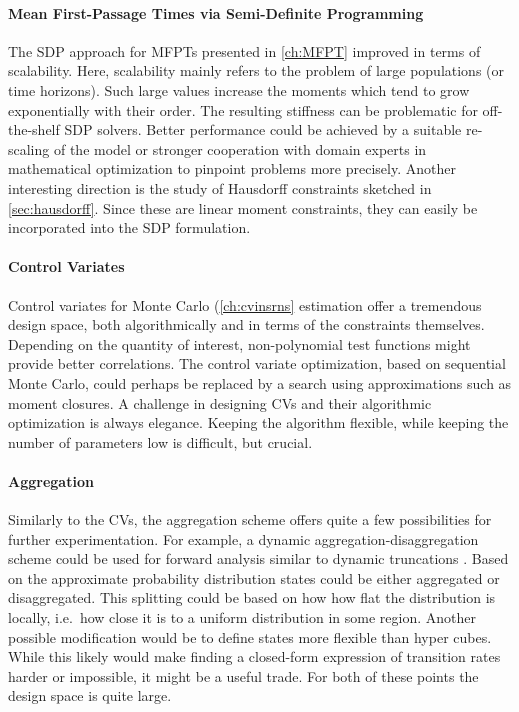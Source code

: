 \paragraph{Mean First-Passage Times via Semi-Definite Programming}
The \ac{SDP} approach for \acp{MFPT} presented in \autoref{ch:MFPT}
improved in terms of scalability.
Here, scalability mainly refers to the problem of large populations
(or time horizons).
Such large values increase the moments which tend to grow
exponentially with their order.
The resulting stiffness can be problematic for off-the-shelf \ac{SDP} solvers.
Better performance could be achieved by a suitable re-scaling of the
model or stronger cooperation with domain experts in mathematical
optimization to pinpoint problems more precisely.
Another interesting direction is the study of Hausdorff constraints
sketched in \autoref{sec:hausdorff}.
Since these are linear moment constraints, they can easily be
incorporated into the \ac{SDP} formulation.

\paragraph{Control Variates}
Control variates for Monte Carlo (\autoref{ch:cvinsrns} estimation
  offer a tremendous design space, both algorithmically and in terms
  of the constraints themselves.
  Depending on the quantity of interest, non-polynomial test
  functions might provide better correlations.
  The control variate optimization, based on sequential Monte Carlo,
  could perhaps be replaced by a search using approximations such as
  moment closures.
  A challenge in designing \acp{CV} and their algorithmic
  optimization is always elegance.
  Keeping the algorithm flexible, while keeping the number of
  parameters low is difficult, but crucial.

  \paragraph{Aggregation}
  Similarly to the \aclp{CV}, the aggregation scheme offers quite a
  few possibilities for further experimentation.
  For example, a dynamic aggregation-disaggregation scheme could be
  used for forward analysis similar to dynamic truncations
  \parencite{andreychenko2011parameter}.
  Based on the approximate probability distribution states could be
  either aggregated or disaggregated.
  This splitting could be based on how how flat the distribution is
  locally, i.e.\ how close it is to a uniform distribution in some region.
  Another possible modification would be to define states more
  flexible than hyper cubes.
  While this likely would make finding a closed-form expression of
  transition rates harder or impossible, it might be a useful trade.
  For both of these points the design space is quite large.

